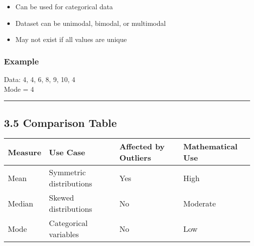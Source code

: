 \documentclass[
  letterpaper,
  DIV=11,
  numbers=noendperiod]{scrreprt}
\providecommand{\tightlist}{%
  \setlength{\itemsep}{0pt}\setlength{\parskip}{0pt}}
\begin{document}
\begin{itemize}
\tightlist
\item
  Can be used for categorical data
\item
  Dataset can be unimodal, bimodal, or multimodal
\item
  May not exist if all values are unique
\end{itemize}

\subsubsection{Example}\label{example-2}

Data: 4, 4, 6, 8, 9, 10, 4\\
Mode = 4

\begin{center}\rule{0.5\linewidth}{0.5pt}\end{center}

\subsection{3.5 Comparison Table}\label{comparison-table}

\begin{longtable}[]{@{}
  >{\raggedright\arraybackslash}p{}
  >{\raggedright\arraybackslash}p{}
  >{\raggedright\arraybackslash}p{}
  >{\raggedright\arraybackslash}p{}@{}}
\toprule\noalign{}
\begin{minipage}[b]{\linewidth}\raggedright
Measure
\end{minipage} & \begin{minipage}[b]{\linewidth}\raggedright
Use Case
\end{minipage} & \begin{minipage}[b]{\linewidth}\raggedright
Affected by Outliers
\end{minipage} & \begin{minipage}[b]{\linewidth}\raggedright
Mathematical Use
\end{minipage} \\
\midrule\noalign{}
\endhead
\bottomrule\noalign{}
\endlastfoot
Mean & Symmetric distributions & Yes & High \\
Median & Skewed distributions & No & Moderate \\
Mode & Categorical variables & No & Low \\
\end{longtable}
\end{document}
